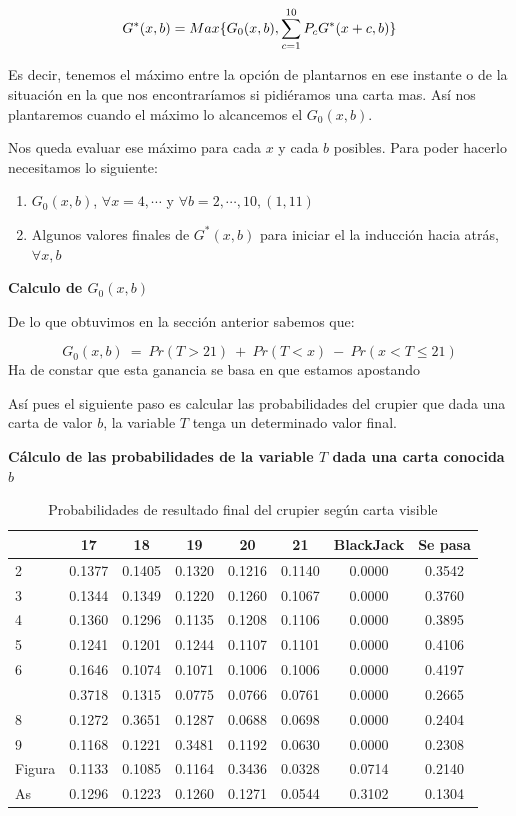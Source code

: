 \documentclass[12pt,a4paper,]{book}
\numberwithin{dummy}{section}
\theoremstyle{ocrenumbox}
\theoremstyle{blacknumex}
\theoremstyle{blacknumbox}
\theoremstyle{ocrenum}
\theoremstyle{ocrenum}
\begin{document}
\[
G^*(x,b) = Max \\ \{G_0(x,b), \sum_{c=1}^{10}P_cG^*(x+c,b) \}
\]

Es decir, tenemos el máximo entre la opción de plantarnos en ese
instante o de la situación en la que nos encontraríamos si pidiéramos
una carta mas. Así nos plantaremos cuando el máximo lo alcancemos el
\(G_0(x,b)\).

Nos queda evaluar ese máximo para cada \(x\) y cada \(b\) posibles. Para
poder hacerlo necesitamos lo siguiente:

\begin{enumerate}
\def\labelenumi{\arabic{enumi}.}
\item
  \(G_0(x,b)\), \(\forall x=4, \cdots\) y
  \(\forall b= 2, \cdots, 10, (1,11)\)
\item
  Algunos valores finales de \(G^*(x,b)\) para iniciar el la inducción
  hacia atrás, \(\forall x,b\)
\end{enumerate}

\textbf{Calculo de \(G_0(x,b)\)}

De lo que obtuvimos en la sección anterior sabemos que:

\[ 
G_0(x,b) \ = \ Pr(T>21) \ + \ Pr(T<x) \ - \ Pr(x<T \leq 21) 
\] Ha de constar que esta ganancia se basa en que estamos apostando

Así pues el siguiente paso es calcular las probabilidades del crupier
que dada una carta de valor \(b\), la variable \(T\) tenga un
determinado valor final.

\textbf{Cálculo de las probabilidades de la variable \(T\) dada una
carta conocida \(b\)}

\begingroup\fontsize{12}{14}\selectfont

\begin{longtable}[t]{lccccccc}
\caption{\label{tab:unnamed-chunk-36}Probabilidades de resultado final del crupier según carta visible}\\
\toprule
 & 17 & 18 & 19 & 20 & 21 & BlackJack & Se pasa\\
\midrule
2 & 0.1377 & 0.1405 & 0.1320 & 0.1216 & 0.1140 & 0.0000 & 0.3542\\
3 & 0.1344 & 0.1349 & 0.1220 & 0.1260 & 0.1067 & 0.0000 & 0.3760\\
4 & 0.1360 & 0.1296 & 0.1135 & 0.1208 & 0.1106 & 0.0000 & 0.3895\\
5 & 0.1241 & 0.1201 & 0.1244 & 0.1107 & 0.1101 & 0.0000 & 0.4106\\
6 & 0.1646 & 0.1074 & 0.1071 & 0.1006 & 0.1006 & 0.0000 & 0.4197\\
\addlinespace
7 & 0.3718 & 0.1315 & 0.0775 & 0.0766 & 0.0761 & 0.0000 & 0.2665\\
8 & 0.1272 & 0.3651 & 0.1287 & 0.0688 & 0.0698 & 0.0000 & 0.2404\\
9 & 0.1168 & 0.1221 & 0.3481 & 0.1192 & 0.0630 & 0.0000 & 0.2308\\
Figura & 0.1133 & 0.1085 & 0.1164 & 0.3436 & 0.0328 & 0.0714 & 0.2140\\
As & 0.1296 & 0.1223 & 0.1260 & 0.1271 & 0.0544 & 0.3102 & 0.1304\\
\bottomrule
\end{longtable}
\endgroup{}
\end{document}
